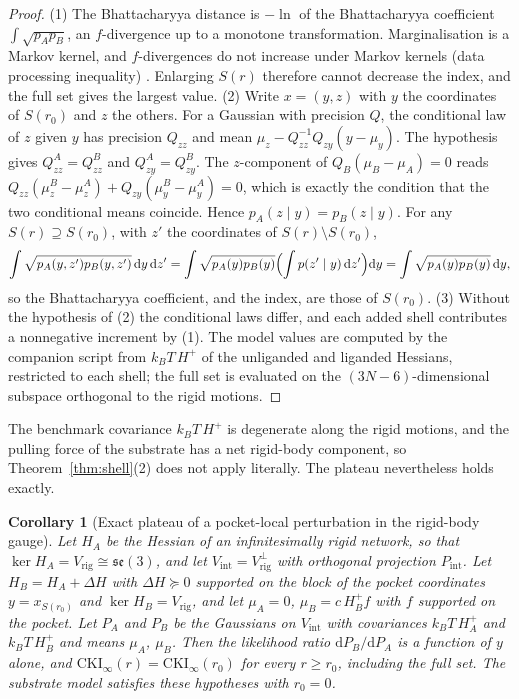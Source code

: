 \documentclass[11pt,reqno]{amsart}
\theoremstyle{plain}
\newtheorem{corollary}[theorem]{Corollary}
\theoremstyle{definition}
\theoremstyle{remark}
\numberwithin{equation}{section}
\newcommand{\dd}{\mathrm{d}}
\begin{document}
\begin{proof}
(1) The Bhattacharyya distance is $-\ln$ of the Bhattacharyya coefficient $\int\sqrt{p_Ap_B}$, an $f$-divergence up to a monotone transformation. Marginalisation is a Markov kernel, and $f$-divergences do not increase under Markov kernels (data processing inequality) \cite{LieseVajda2006}. Enlarging $S(r)$ therefore cannot decrease the index, and the full set gives the largest value.
(2) Write $x=(y,z)$ with $y$ the coordinates of $S(r_0)$ and $z$ the others. For a Gaussian with precision $Q$, the conditional law of $z$ given $y$ has precision $Q_{zz}$ and mean $\mu_z-Q_{zz}^{-1}Q_{zy}(y-\mu_y)$. The hypothesis gives $Q^A_{zz}=Q^B_{zz}$ and $Q^A_{zy}=Q^B_{zy}$. The $z$-component of $Q_B(\mu_B-\mu_A)=0$ reads $Q_{zz}(\mu^B_z-\mu^A_z)+Q_{zy}(\mu^B_y-\mu^A_y)=0$, which is exactly the condition that the two conditional means coincide. Hence $p_A(z\mid y)=p_B(z\mid y)$. For any $S(r)\supseteq S(r_0)$, with $z'$ the coordinates of $S(r)\setminus S(r_0)$,
\[
\int\sqrt{p_A(y,z')p_B(y,z')}\,\dd y\,\dd z'=\int\sqrt{p_A(y)p_B(y)}\Bigl(\int p(z'\mid y)\,\dd z'\Bigr)\dd y=\int\sqrt{p_A(y)p_B(y)}\,\dd y,
\]
so the Bhattacharyya coefficient, and the index, are those of $S(r_0)$.
(3) Without the hypothesis of (2) the conditional laws differ, and each added shell contributes a nonnegative increment by (1).
The model values are computed by the companion script from $k_BT\,H^{+}$ of the unliganded and liganded Hessians, restricted to each shell; the full set is evaluated on the $(3N-6)$-dimensional subspace orthogonal to the rigid motions.
\end{proof}

The benchmark covariance $k_BT\,H^{+}$ is degenerate along the rigid motions, and the pulling force of the substrate has a net rigid-body component, so Theorem~\ref{thm:shell}(2) does not apply literally. The plateau nevertheless holds exactly.

\begin{corollary}[Exact plateau of a pocket-local perturbation in the rigid-body gauge]\label{cor:plateau}
Let $H_A$ be the Hessian of an infinitesimally rigid network, so that $\ker H_A=V_{\mathrm{rig}}\cong\mathfrak{se}(3)$, and let $V_{\mathrm{int}}=V_{\mathrm{rig}}^{\perp}$ with orthogonal projection $P_{\mathrm{int}}$. Let $H_B=H_A+\Delta H$ with $\Delta H\succeq0$ supported on the block of the pocket coordinates $y=x_{S(r_0)}$ and $\ker H_B=V_{\mathrm{rig}}$, and let $\mu_A=0$, $\mu_B=c\,H_B^{+}f$ with $f$ supported on the pocket. Let $P_A$ and $P_B$ be the Gaussians on $V_{\mathrm{int}}$ with covariances $k_BT\,H_A^{+}$ and $k_BT\,H_B^{+}$ and means $\mu_A$, $\mu_B$. Then the likelihood ratio $\dd P_B/\dd P_A$ is a function of $y$ alone, and $\mathrm{CKI}_\infty(r)=\mathrm{CKI}_\infty(r_0)$ for every $r\ge r_0$, including the full set. The substrate model satisfies these hypotheses with $r_0=0$.
\end{corollary}
\end{document}
